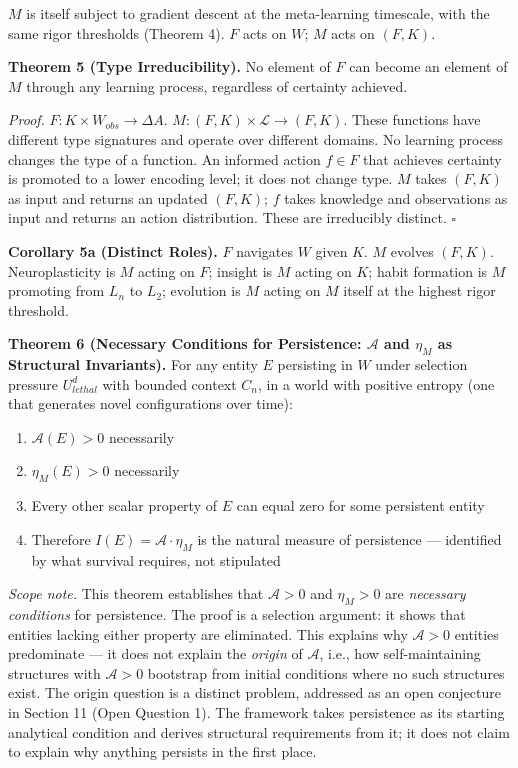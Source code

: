 \documentclass[
]{article}
\providecommand{\tightlist}{%
  \setlength{\itemsep}{0pt}\setlength{\parskip}{0pt}}
\begin{document}
\(M\) is itself subject to gradient descent at the meta-learning
timescale, with the same rigor thresholds (Theorem 4). \(F\) acts on
\(W\); \(M\) acts on \((F, K)\).

\textbf{Theorem 5 (Type Irreducibility).} No element of \(F\) can become
an element of \(M\) through any learning process, regardless of
certainty achieved.

\emph{Proof.} \(F : K \times W_{obs} \rightarrow \Delta A\).
\(M : (F, K) \times \mathcal{L} \rightarrow (F, K)\). These functions
have different type signatures and operate over different domains. No
learning process changes the type of a function. An informed action
\(f \in F\) that achieves certainty is promoted to a lower encoding
level; it does not change type. \(M\) takes \((F, K)\) as input and
returns an updated \((F, K)\); \(f\) takes knowledge and observations as
input and returns an action distribution. These are irreducibly
distinct. \(\square\)

\textbf{Corollary 5a (Distinct Roles).} \(F\) navigates \(W\) given
\(K\). \(M\) evolves \((F, K)\). Neuroplasticity is \(M\) acting on
\(F\); insight is \(M\) acting on \(K\); habit formation is \(M\)
promoting from \(L_n\) to \(L_2\); evolution is \(M\) acting on \(M\)
itself at the highest rigor threshold.

\textbf{Theorem 6 (Necessary Conditions for Persistence: \(\mathcal{A}\)
and \(\eta_M\) as Structural Invariants).} For any entity \(E\)
persisting in \(W\) under selection pressure \(U_{lethal}^d\) with
bounded context \(C_n\), in a world with positive entropy (one that
generates novel configurations over time):

\begin{enumerate}
\def\labelenumi{\arabic{enumi}.}
\tightlist
\item
  \(\mathcal{A}(E) > 0\) necessarily
\item
  \(\eta_M(E) > 0\) necessarily
\item
  Every other scalar property of \(E\) can equal zero for some
  persistent entity
\item
  Therefore \(I(E) = \mathcal{A} \cdot \eta_M\) is the natural measure
  of persistence --- identified by what survival requires, not
  stipulated
\end{enumerate}

\emph{Scope note.} This theorem establishes that \(\mathcal{A} > 0\)
and \(\eta_M > 0\) are \emph{necessary conditions} for persistence. The
proof is a selection argument: it shows that entities lacking either
property are eliminated. This explains why \(\mathcal{A} > 0\) entities
predominate --- it does not explain the \emph{origin} of
\(\mathcal{A}\), i.e., how self-maintaining structures with
\(\mathcal{A} > 0\) bootstrap from initial conditions where no such
structures exist. The origin question is a distinct problem, addressed
as an open conjecture in Section 11 (Open Question 1). The framework
takes persistence as its starting analytical condition and derives
structural requirements from it; it does not claim to explain why
anything persists in the first place.
\end{document}
